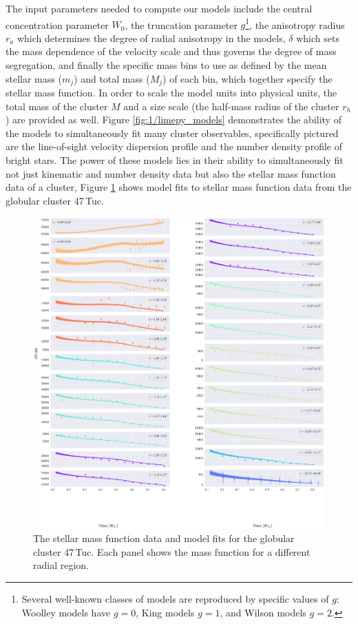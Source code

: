 The input parameters needed to compute our models include the central concentration parameter $W_0$,
the truncation parameter $g$\footnote{Several well-known classes of models are reproduced by
specific values of $g$: Woolley models \citep{Woolley1954} have $g=0$, King models \citep{King1966}
$g=1$, and Wilson models \citep{Wilson1975} $g=2$.}, the anisotropy radius $r_a$ which determines
the degree of radial anisotropy in the models, $\delta$ which sets the mass dependence of the
velocity scale and thus governs the degree of mass segregation, and finally the specific mass bins
to use as defined by the mean stellar mass ($m_j$) and total mass ($M_j$) of each bin, which
together specify the stellar mass function. In order to scale the model units into physical units,
the total mass of the cluster $M$ and a size scale (the half-mass radius of the cluster $r_h$) are
provided as well. Figure \ref{fig:1/limepy_models} demonstrates the ability of the models to
simultaneously fit many cluster observables, specifically pictured are the line-of-sight velocity
dispersion profile and the number density profile of bright stars. The power of these models lies in
their ability to simultaneously fit not just kinematic and number density data but also the stellar
mass function data of a cluster, Figure \ref{fig:1/massfunc_fit} shows model fits to stellar mass
function data from the globular cluster 47\,Tuc.


\begin{figure}
	\centering
	\includegraphics[width=\textwidth]{./figures/prev_nobin/mass_fun.png}
	\caption{The stellar mass function data and model fits for the globular cluster 47\,Tuc.
		Each panel shows the mass function for a different radial region.}
	\label{fig:1/massfunc_fit}
\end{figure}


